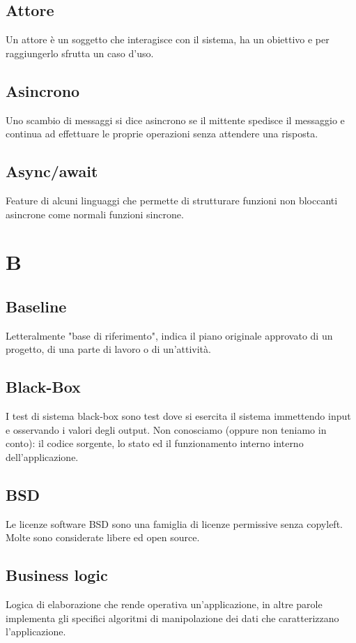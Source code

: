 \subsection*{Attore}
Un attore è un soggetto che interagisce con il sistema, ha un obiettivo e per raggiungerlo sfrutta un caso d'uso\glo. 

\subsection*{Asincrono}
Uno scambio di messaggi si dice asincrono se il mittente spedisce il messaggio e continua ad effettuare le proprie operazioni senza attendere una risposta.

\subsection*{Async/await}
Feature di alcuni linguaggi che permette di strutturare funzioni non bloccanti asincrone come normali funzioni sincrone.

\clearpage
\section*{B}

\subsection*{Baseline}
Letteralmente "base di riferimento", indica il piano originale approvato di un progetto, di una parte di lavoro o di un'attività.

\subsection*{Black-Box}
I test di sistema black-box sono test dove si esercita il sistema immettendo input e osservando i valori degli output.
Non conosciamo (oppure non teniamo in conto): il codice sorgente, lo stato ed il funzionamento interno interno dell’applicazione.

\subsection*{BSD}
Le licenze software BSD sono una famiglia di licenze permissive senza copyleft. Molte sono considerate libere ed open source.

\subsection*{Business logic}
Logica di elaborazione che rende operativa un'applicazione, in altre parole implementa gli specifici algoritmi di manipolazione dei dati che caratterizzano l’applicazione.

